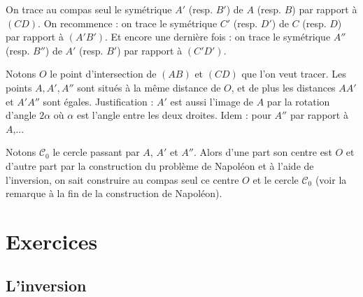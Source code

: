 \documentclass[11pt,class=report,crop=false]{standalone}
\begin{document}
On trace au compas seul le symétrique $A'$ (resp. $B'$) de $A$ (resp. $B$) par rapport à $(CD)$.
On recommence : on trace le symétrique $C'$ (resp. $D'$) de $C$ (resp. $D$)  par rapport à $(A'B')$.
Et encore une dernière fois : on trace le symétrique $A''$ (resp. $B''$) de $A'$ (resp. $B'$) par rapport à $(C'D')$.

Notons $O$ le point d'intersection de $(AB)$ et $(CD)$ que l'on veut tracer.
Les points $A,A',A''$ sont situés à la même distance de $O$, et de plus les distances
$AA'$ et $A'A''$ sont égales. Justification : 
$A'$ est aussi l'image de $A$ par la rotation d'angle $2\alpha$ où $\alpha$ est l'angle entre les deux droites.
Idem : pour $A''$ par rapport à $A$,...

Notons $\mathcal{C}_0$ le cercle passant par $A$, $A'$ et $A''$.
Alors d'une part son centre est $O$ et d'autre part
par la construction du problème de Napoléon et à l'aide de l'inversion, on sait 
construire au compas seul ce centre $O$ et le cercle $\mathcal{C}_0$ 
(voir la remarque à la fin de la construction de Napoléon).



\section{Exercices}



\subsection{L'inversion}
\end{document}
